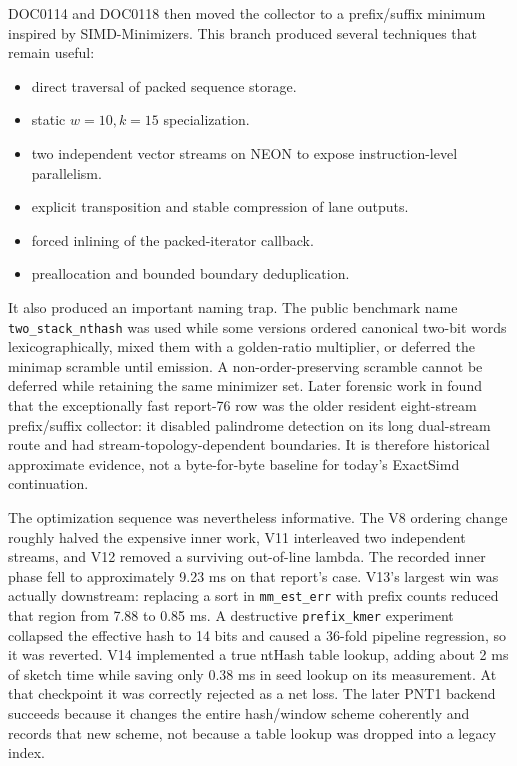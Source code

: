 DOC0114 and DOC0118 then moved the collector to a prefix/suffix minimum
inspired by SIMD-Minimizers.  This branch produced several techniques that
remain useful:

\begin{itemize}
  \item direct traversal of packed sequence storage.
  \item static $w=10,k=15$ specialization.
  \item two independent vector streams on NEON to expose instruction-level
        parallelism.
  \item explicit transposition and stable compression of lane outputs.
  \item forced inlining of the packed-iterator callback.
  \item preallocation and bounded boundary deduplication.
\end{itemize}

It also produced an important naming trap.  The public benchmark name
\texttt{two\_stack}\allowbreak\texttt{\_nthash} was used while some versions ordered canonical
two-bit words lexicographically, mixed them with a golden-ratio multiplier, or
deferred the minimap scramble until emission.  A non-order-preserving scramble
cannot be deferred while retaining the same minimizer set. Later forensic work
in
found that the exceptionally fast report-76 row was the older
resident eight-stream prefix/suffix collector: it disabled palindrome
detection on its long dual-stream route and had stream-topology-dependent
boundaries.  It is therefore historical approximate evidence, not a
byte-for-byte baseline for today's ExactSimd continuation.

The optimization sequence was nevertheless informative.  The V8 ordering
change roughly halved the expensive inner work, V11 interleaved two independent
streams, and V12 removed a surviving out-of-line lambda. The recorded inner
phase fell to approximately 9.23 ms on that report's case.  V13's largest win
was actually downstream: replacing a sort in \texttt{mm\_est\_err} with prefix
counts reduced that region from 7.88 to 0.85 ms.  A destructive
\texttt{prefix\_kmer} experiment collapsed the effective hash to 14 bits and
caused a 36-fold pipeline regression, so it was reverted.  V14 implemented a
true ntHash table lookup, adding about 2 ms of sketch time while saving only
0.38 ms in seed lookup on its measurement.  At that checkpoint it was
correctly rejected as a net loss.  The later PNT1 backend succeeds because it
changes the entire hash/window scheme coherently and records that new scheme,
not because a table lookup was dropped into a legacy index.

